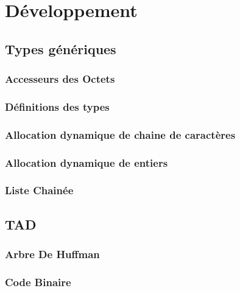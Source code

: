 \documentclass{article}
\begin{document}
\section{Développement}
\subsection{Types génériques}
\subsubsection{Accesseurs des Octets}
	
	\bigskip
\subsubsection{Définitions des types}
	
	\bigskip
\subsubsection{Allocation dynamique de chaine de caractères}
	
	\bigskip
\subsubsection{Allocation dynamique de entiers}
	
	\bigskip
\subsubsection{Liste Chainée}
	
	\bigskip
\subsection{TAD}
\subsubsection{Arbre De Huffman}
	
	\bigskip
\subsubsection{Code Binaire}
	
	\bigskip
\end{document}
